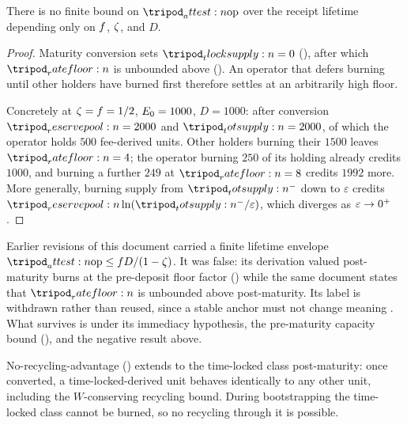 \documentclass[../main.tex]{subfiles}
\begin{document}
\begin{theorem}
    \label{thm:seigniorage:no-finite-lifetime-envelope}
    There is no finite bound on $\attest{\opidx}$ over the receipt lifetime depending only
    on $f$, $\zeta$, and $D$.
\end{theorem}
\begin{proof}
    Maturity conversion sets $\tlocksupply{} = 0$
    (), after which $\ratefloor{}$ is unbounded above
    (). An operator that defers burning
    until other holders have burned first therefore settles at an arbitrarily high floor.

    Concretely at $\zeta = f = 1/2$, $E\sb{0} = 1000$, $D = 1000$: after
    conversion $\reservepool{} = 2000$ and $\totsupply{} = 2000$, of which the operator holds
    $500$ fee-derived units. Other holders burning their $1500$ leaves
    $\ratefloor{} = 4$; the operator burning $250$ of its holding already credits $1000$,
    and burning a further $249$ at $\ratefloor{} = 8$ credits $1992$ more. More generally,
    burning supply from $\totsupply{}\sp{-}$ down to $\varepsilon$ credits
    $\reservepool{}\ln(\totsupply{}\sp{-}/\varepsilon)$, which diverges as
    $\varepsilon \to 0\sp{+}$.
\end{proof}

\begin{remark}
    \label{rem:seigniorage:withdrawn-envelope}
    Earlier revisions of this document carried a finite lifetime envelope
    $\attest{\opidx} \leq \feerate D/(1-\livesplit)$. It was false: its derivation valued
    post-maturity burns at the pre-deposit floor factor
    () while the same document states that
    $\ratefloor{}$ is unbounded above post-maturity. Its label is withdrawn rather than
    reused, since a stable anchor must not change meaning
    \atthislayer{}. What survives is
     under its immediacy hypothesis, the
    pre-maturity capacity bound
    (), and the negative result above.
\end{remark}

%
No-recycling-advantage () extends to the
time-locked class post-maturity: once converted, a time-locked-derived \liveclass{} unit
behaves identically to any other \liveclass{} unit, including the $W$-conserving recycling
bound. During bootstrapping the time-locked class cannot be burned, so no recycling through
it is possible.

\end{document}
